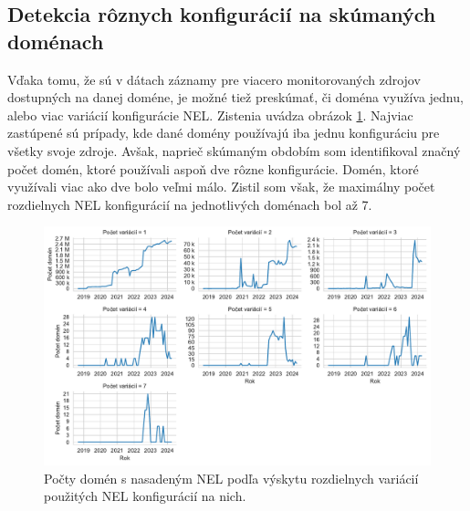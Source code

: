 \subsection{Detekcia rôznych konfigurácií na skúmaných doménach}

Vďaka tomu, že sú v dátach záznamy pre viacero monitorovaných zdrojov dostupných na danej doméne, je možné tiež preskúmať, či doména využíva jednu, alebo viac variácií konfigurácie NEL.
Zistenia uvádza obrázok \ref{fig:httparchive-nel-config-variations}.
Najviac zastúpené sú prípady, kde dané domény používajú iba jednu konfiguráciu pre všetky svoje zdroje.
Avšak, naprieč skúmaným obdobím som identifikoval značný počet domén, ktoré používali aspoň dve rôzne konfigurácie.
Domén, ktoré využívali viac ako dve bolo veľmi málo.
Zistil som však, že maximálny počet rozdielnych NEL konfigurácií na jednotlivých doménach bol až 7.

\begin{figure}[!htb]
\begin{center}
 \includegraphics[scale=0.63]{obrazky-figures/httparchive_nel_config_variability_dist.pdf}
 \caption{Počty domén s nasadeným NEL podľa výskytu rozdielnych variácií použitých NEL konfigurácií na nich.}
 \label{fig:httparchive-nel-config-variations}
\end{center}
\end{figure}


